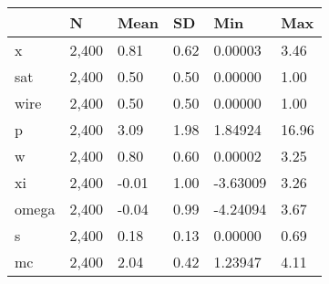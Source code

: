 \begin{table}[htbp]
\begin{tabular}{|l|l|l|l|l|l|}\hline  
 & N  & Mean  & SD  & Min  & Max  \\ \hline  
x &     2,400 &      0.81 &      0.62 &   0.00003 &      3.46 \\ \hline 
sat &     2,400 &      0.50 &      0.50 &   0.00000 &      1.00 \\ \hline 
wire &     2,400 &      0.50 &      0.50 &   0.00000 &      1.00 \\ \hline 
p &     2,400 &      3.09 &      1.98 &   1.84924 &     16.96 \\ \hline 
w &     2,400 &      0.80 &      0.60 &   0.00002 &      3.25 \\ \hline 
xi &     2,400 &     -0.01 &      1.00 &  -3.63009 &      3.26 \\ \hline 
omega &     2,400 &     -0.04 &      0.99 &  -4.24094 &      3.67 \\ \hline 
s &     2,400 &      0.18 &      0.13 &   0.00000 &      0.69 \\ \hline 
mc &     2,400 &      2.04 &      0.42 &   1.23947 &      4.11 \\ \hline 
  \end{tabular}
\end{table}
